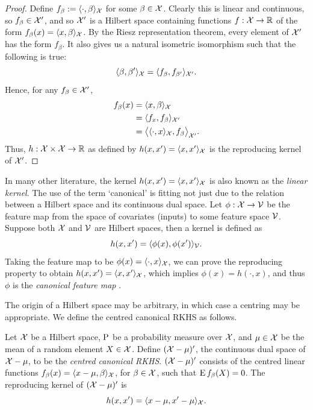\begin{proof}
  Define $f_\beta := \langle\cdot,\beta\rangle_{\mathcal X}$ for some $\beta \in {\mathcal X}$.
  Clearly this is linear and continuous, so $f_\beta\in{\mathcal X}'$, and so ${\mathcal X}'$ is a Hilbert space containing functions $f:{\mathcal X}\to\mathbb{R}$ of the form $f_\beta(x) = \langle x,\beta\rangle_{\mathcal X}$.
  By the Riesz representation theorem, every element of ${\mathcal X}'$ has the form $f_\beta$.
  It also gives us a natural isometric isomorphism such that the following is true:
  \[
    \langle\beta,\beta'\rangle_{\mathcal X} = \langle f_\beta,f_{\beta'}\rangle_{{\mathcal X}'}.
  \]
  Hence, for any $f_\beta\in{\mathcal X}'$, 
  \begin{align*}
    f_\beta(x) 
    &= \langle x,\beta\rangle_{\mathcal X} \\
    &= \langle f_x,f_{\beta}\rangle_{{\mathcal X}'} \\
    &= \big\langle \langle\cdot,x\rangle_{\mathcal X},f_{\beta} \big\rangle_{{\mathcal X}'}.
  \end{align*}
  Thus, $h:{\mathcal X}\times{\mathcal X}\to\mathbb{R}$ as defined by $h(x,x') = \langle x,x'\rangle_{\mathcal X}$ is the reproducing kernel of ${\mathcal X}'$.
\end{proof}

In many other literature, the kernel $h(x,x') = \langle x,x'\rangle_{\mathcal X}$ is also known as the \emph{linear kernel}.
The use of the term `canonical' is fitting not just due to the relation between a Hilbert space and its continuous dual space.
Let $\phi:{\mathcal X}\to{\mathcal V}$ be the feature map from the space of covariates (inputs) to some feature space ${\mathcal V}$.
Suppose both ${\mathcal X}$ and ${\mathcal V}$ are Hilbert spaces, then a kernel is defined as 
\[
  h(x,x') = \langle\phi(x),\phi(x')\rangle_{\mathcal V}.
\]
Taking the feature map to be $\phi(x) = \langle\cdot,x\rangle_{\mathcal X}$, we can prove the reproducing property to obtain $h(x,x') = \langle x,x'\rangle_{\mathcal X}$, which implies $\phi(x) = h(\cdot,x)$, and thus $\phi$ is the \emph{canonical feature map} \citep[Lemma 4.19]{steinwart2008support}.

The origin of a Hilbert space may be arbitrary, in which case a centring may be appropriate.
We define the centred canonical RKHS as follows.

\begin{definition}
  Let ${\mathcal X}$ be a Hilbert space, $\operatorname{P}$ be a probability measure over ${\mathcal X}$, and $\mu\in{\mathcal X}$ be the mean of a random element $X\in{\mathcal X}$. 
  Define $({\mathcal X} - \mu)'$, the continuous dual space of ${\mathcal X} - \mu$, to be the \emph{centred canonical RKHS}.
  $({\mathcal X} - \mu)'$ consists of the centred linear functions $f_\beta(x)=\langle x-\mu,\beta\rangle_{\mathcal X}$, for $\beta\in{\mathcal X}$, such that $\operatorname{E} f_\beta(X) = 0$.
  The reproducing kernel of $({\mathcal X} - \mu)'$ is
  \[
    h(x,x') = \langle x-\mu,x'-\mu\rangle_{\mathcal X}.
  \]
\end{definition}

